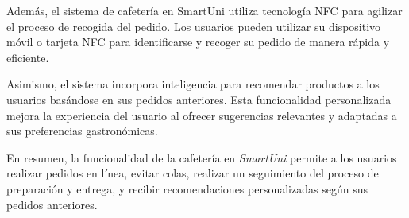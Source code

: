\documentclass[12pt]{report}
\begin{document}
\begin{itemize}
Además, el sistema de cafetería en SmartUni utiliza tecnología NFC para agilizar el proceso de recogida del pedido. Los usuarios pueden utilizar su dispositivo móvil o tarjeta NFC para identificarse y recoger su pedido de manera rápida y eficiente.

Asimismo, el sistema incorpora inteligencia para recomendar productos a los usuarios basándose en sus pedidos anteriores. Esta funcionalidad personalizada mejora la experiencia del usuario al ofrecer sugerencias relevantes y adaptadas a sus preferencias gastronómicas.

En resumen, la funcionalidad de la cafetería en \textit{SmartUni} permite a los usuarios realizar pedidos en línea, evitar colas, realizar un seguimiento del proceso de preparación y entrega, y recibir recomendaciones personalizadas según sus pedidos anteriores.
\end{itemize}
\end{document}

